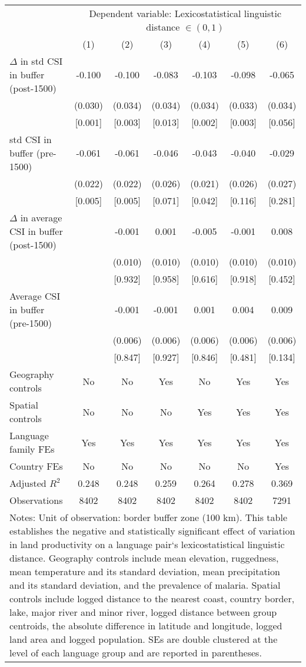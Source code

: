 
\begin{tabular}{lcccccc}
\toprule\toprule
& \multicolumn{6}{p{0.5\textwidth}}{\raggedleft Dependent variable: Lexicostatistical linguistic distance $\in(0,1)$} \tabularnewline
\cmidrule(lr){2-7}
 & (1)  & (2)  & (3)  & (4)  & (5)  & (6) \tabularnewline
    
\midrule$\Delta$ in std CSI in buffer (post-1500) & -0.100 & -0.100 & -0.083  & -0.103 & -0.098 & -0.065 \tabularnewline
& (0.030) & (0.034)  & (0.034) & (0.034) & (0.033) & (0.034) \tabularnewline
& [0.001] & [0.003]  & [0.013]  & [0.002]  & [0.003]  & [0.056]  \tabularnewline
    
std CSI in buffer (pre-1500) & -0.061 & -0.061 & -0.046  & -0.043 & -0.040 & -0.029  \tabularnewline
& (0.022) & (0.022)  & (0.026) & (0.021) & (0.026) & (0.027) \tabularnewline
& [0.005] & [0.005]  & [0.071]  & [0.042]  & [0.116]  & [0.281]  \tabularnewline

$\Delta$ in average CSI in buffer (post-1500) &  & -0.001 & 0.001  & -0.005 & -0.001 & 0.008  \tabularnewline
&  & (0.010)  & (0.010) & (0.010) & (0.010) & (0.010) \tabularnewline
&  & [0.932]  & [0.958]  & [0.616]  & [0.918]  & [0.452] \tabularnewline

Average CSI in buffer (pre-1500) &  & -0.001 & -0.001  & 0.001 & 0.004 & 0.009 \tabularnewline
&  & (0.006)  & (0.006) & (0.006) & (0.006) & (0.006) \tabularnewline
&  & [0.847]  & [0.927]  & [0.846]  & [0.481]  & [0.134]   \tabularnewline
    
\midrule
Geography controls & No & No & Yes & No & Yes & Yes \tabularnewline
Spatial controls & No & No & No & Yes & Yes & Yes \tabularnewline
Language family FEs & Yes & Yes & Yes & Yes & Yes & Yes \tabularnewline
Country FEs & No & No & No & No & No & Yes \tabularnewline
Adjusted $R^{2}$
 & 0.248 & 0.248 & 0.259 & 0.264 & 0.278 & 0.369  \tabularnewline
Observations & 8402 & 8402 & 8402 & 8402 & 8402 & 7291  \tabularnewline
    
\bottomrule
\multicolumn{7}{p{\textwidth}}{\scriptsize Notes: Unit of observation: border buffer zone (100 km). This table establishes the negative and statistically significant effect of variation in land productivity on a language pair`s lexicostatistical linguistic distance. Geography controls include mean elevation, ruggedness, mean temperature and its standard deviation, mean precipitation and its standard deviation, and the prevalence of malaria. Spatial controls include logged distance to the nearest coast, country border, lake, major river and minor river, logged distance between group centroids, the absolute difference in latitude and longitude, logged land area and logged population. SEs are double clustered at the level of each language group and are reported in parentheses.}
\end{tabular}%
